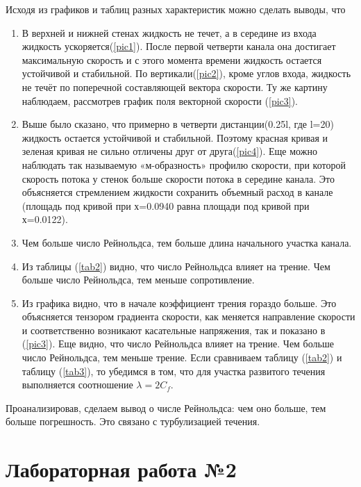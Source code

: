 \documentclass[12pt, a4paper]{article}
\begin{document}
Исходя из графиков и таблиц разных характеристик можно сделать выводы, что
\begin{enumerate}
    \item
        В верхней и нижней стенах жидкость не течет, а в середине из входа жидкость ускоряется(\ref{pic1}). После первой четверти канала она достигает максимальную скорость и с этого момента времени жидкость остается устойчивой и стабильной. По вертикали(\ref{pic2}), кроме углов входа, жидкость не течёт по поперечной составляющей вектора скорости. Ту же картину наблюдаем, рассмотрев график поля векторной скорости (\ref{pic3}).
    \item
        Выше было сказано, что примерно в четверти дистанции(0.25l, где l=20) жидкость остается устойчивой и стабильной. Поэтому красная кривая и зеленая кривая не сильно отличены друг от друга(\ref{pic4}). Еще можно наблюдать так называемую «м-образность» профилю скорости, при которой скорость потока у стенок больше скорости потока в середине канала. Это объясняется стремлением жидкости сохранить объемный расход в канале (площадь под кривой при х=0.0940 равна площади под кривой при х=0.0122).
    \item
        Чем больше число Рейнольдса, тем больше длина начального участка канала.
    \item
        Из таблицы (\ref{tab2}) видно, что число Рейнольдса влияет на трение. Чем больше число Рейнольдса, тем меньше сопротивление.
    \item
        Из графика видно, что в начале коэффициент трения гораздо больше. Это объясняется тензором градиента скорости, как меняется направление скорости и соответственно возникают касательные напряжения, так и показано в (\ref{pic3}). Еще видно, что число Рейнольдса влияет на трение. Чем больше число Рейнольдса, тем меньше трение. Если сравниваем таблицу (\ref{tab2}) и таблицу (\ref{tab3}), то убедимся в том, что для участка развитого течения выполняется соотношение $\lambda = 2 C_f$.
\end{enumerate}
Проанализировав, сделаем вывод о числе Рейнольдса: чем оно больше, тем больше погрешность. Это связано с турбулизацией течения.

\newpage
\section{Лабораторная работа №2}
\end{document}
